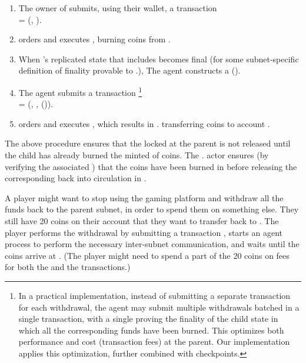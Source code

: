 \begin{enumerate}

    \item The owner of  submits, using their wallet, a transaction\\
     = (, ).
    
    \item {} orders and executes , burning  coins from .%
    
    \item When 's replicated state that includes  becomes final (for some subnet-specific definition of finality provable to .),
    The \ipc agent constructs a {\pof}().
    
    \item The \ipc agent submits a transaction%
    \footnote{In a practical implementation, instead of submitting a separate transaction for each withdrawal,
    the \ipc agent may submit multiple withdrawals batched in a single transaction,
    with a single \pof proving the finality of the child state in which all the corresponding funds have been burned.
    This optimizes both performance and cost (transaction fees) at the parent.
    Our implementation applies this optimization, further combined with checkpoints.}\\
     = (, , {\pof}()).
    
    \item {} orders and executes , which results in . transferring  coins to account .
    
\end{enumerate}

The above procedure ensures that the locked  at the parent is not released until the child has already burned the minted  of coins.
The . actor ensures (by verifying the associated \pof) that the coins have been burned in 
before releasing the corresponding  back into circulation in .

\begin{example}
\label{ex:withdrawal}
A player might want to stop using the gaming platform and withdraw all the funds back to the parent subnet, in order to spend them on something else.
They still have 20 coins on their account  that they want to transfer back to .
The player performs the withdrawal by submitting a transaction ,
starts an \ipc agent process to perform the necessary inter-subnet communication, and waits until the coins arrive at .
(The player might need to spend a part of the 20 coins on fees for both the  and the  transactions.)
\end{example}


